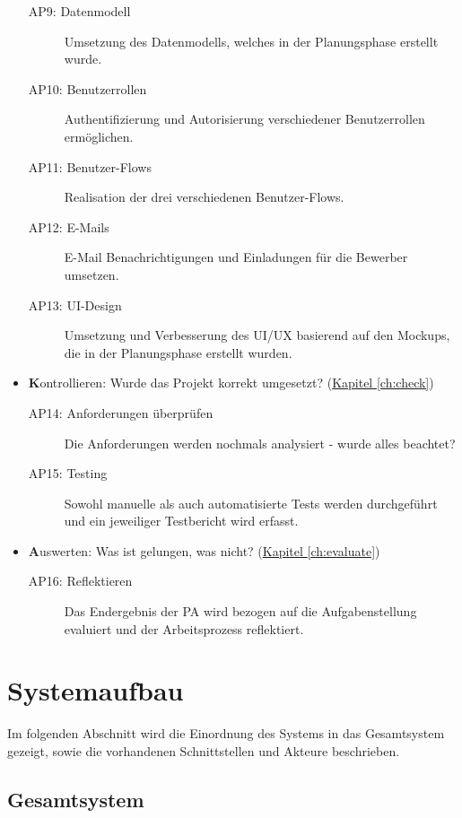 \begin{itemize}
\begin{description}
              \item[AP9: Datenmodell] Umsetzung des Datenmodells, welches in der Planungsphase erstellt wurde.
              \item[AP10: Benutzerrollen] Authentifizierung und Autorisierung verschiedener Benutzerrollen ermöglichen.
              \item[AP11: Benutzer-Flows] Realisation der drei verschiedenen Benutzer-Flows.
              \item[AP12: E-Mails] E-Mail Benachrichtigungen und Einladungen für die Bewerber umsetzen.
              \item[AP13: UI-Design] Umsetzung und Verbesserung des UI/UX basierend auf den Mockups, die in der Planungsphase erstellt wurden.
          \end{description}
    \item \textbf{K}ontrollieren: Wurde das Projekt korrekt umgesetzt? (\hyperref[ch:check]{Kapitel \ref*{ch:check}})
          \begin{description}
              \item[AP14: Anforderungen überprüfen] Die Anforderungen werden nochmals analysiert - wurde alles beachtet?
              \item[AP15: Testing] Sowohl manuelle als auch automatisierte Tests werden durchgeführt und ein jeweiliger Testbericht wird erfasst.
          \end{description}
    \item \textbf{A}uswerten: Was ist gelungen, was nicht? (\hyperref[ch:evaluate]{Kapitel \ref*{ch:evaluate}})
          \begin{description}
              \item[AP16: Reflektieren] Das Endergebnis der PA wird bezogen auf die Aufgabenstellung evaluiert und der Arbeitsprozess reflektiert.
          \end{description}
\end{itemize}

\newpage

\section{Systemaufbau}

Im folgenden Abschnitt wird die Einordnung des Systems in das Gesamtsystem gezeigt, sowie die vorhandenen Schnittstellen und Akteure beschrieben.

\subsection{Gesamtsystem}

